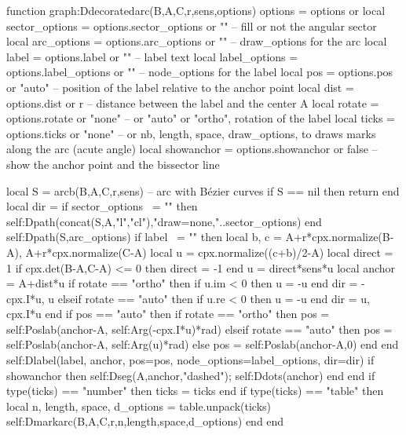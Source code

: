 \documentclass{standalone}
\begin{document}
\begin{luacode*}
function graph:Ddecoratedarc(B,A,C,r,sens,options)
    options = options or {}
    local sector_options = options.sector_options or "" -- fill or not the angular sector
    local arc_options = options.arc_options or "" -- draw_options for the arc
    local label = options.label or "" -- label text
    local label_options = options.label_options or "" -- node_options for the label
    local pos = options.pos or "auto" -- position of the label relative to the anchor point
    local dist = options.dist or r -- distance between the label and the center A
    local rotate = options.rotate or "none" -- or "auto" or "ortho", rotation of the label
    local ticks = options.ticks or "none" -- or {nb, length, space, draw_options}, to draws marks along the arc (acute angle)
    local showanchor = options.showanchor or false -- show the anchor point and the bissector line
    
    local S = arcb(B,A,C,r,sens) -- arc with Bézier curves
    if S == nil then return end
    local dir = {}
    if sector_options ~= "" then
        self:Dpath(concat(S,{A,"l","cl"}),"draw=none,"..sector_options)
    end
    self:Dpath(S,arc_options)
    if label ~= "" then
        local b, c = A+r*cpx.normalize(B-A), A+r*cpx.normalize(C-A)
        local u = cpx.normalize((c+b)/2-A)
        local direct = 1
        if cpx.det(B-A,C-A) <= 0 then direct = -1 end
        u = direct*sens*u
        local anchor = A+dist*u
        if rotate == "ortho" then 
            if u.im < 0 then u = -u end
            dir = {-cpx.I*u, u} 
        elseif rotate == "auto" then
            if u.re < 0 then u = -u end
            dir = {u, cpx.I*u} 
        end
        if pos == "auto" then 
            if rotate == "ortho" then 
                pos = self:Poslab(anchor-A, self:Arg(-cpx.I*u)*rad) 
            elseif rotate == "auto" then
                pos = self:Poslab(anchor-A, self:Arg(u)*rad) 
            else pos = self:Poslab(anchor-A,0)
            end 
        end
        self:Dlabel(label, anchor, {pos=pos, node_options=label_options, dir=dir})
        if showanchor then self:Dseg({A,anchor},"dashed"); self:Ddots(anchor) end
    end
    if type(ticks) == "number" then ticks = {ticks} end
    if type(ticks) == "table" then
        local n, length, space, d_options = table.unpack(ticks)
        self:Dmarkarc(B,A,C,r,n,length,space,d_options)
    end
end
\end{luacode*}
\end{document}
